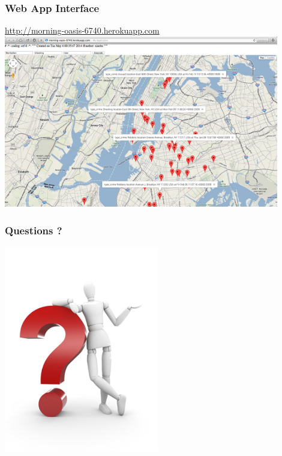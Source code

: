 \documentclass{beamer}
\begin{document}
    \begin{frame}
        \frametitle{Web App Interface}
        \url{http://morning-oasis-6740.herokuapp.com}
        \centering
        \includegraphics[width=12cm]{eagleeye_gui}
    \end{frame}
    
    \begin{frame}
        \frametitle{Questions ?}
        \centering
        \includegraphics[height=9cm]{questions}
    \end{frame}
\end{document}
